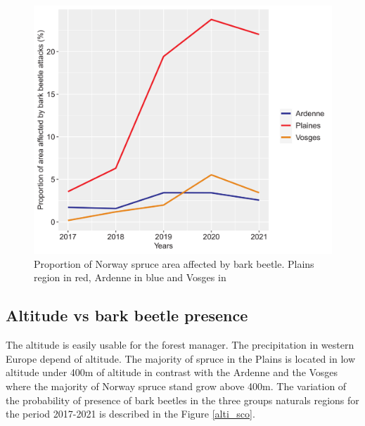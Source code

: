\documentclass[3p,procedia]{elsarticle}
\begin{document}


\begin{figure}
   \centering
   \includegraphics[width=0.6 \textwidth]{Annual_evol_Ardennes_vosges_plaines.png}
    \caption{Proportion of Norway spruce area affected by bark beetle. Plains region in red, Ardenne in blue and Vosges in }
    \label{evol_gen}
\end{figure}

    


\subsection{ Altitude vs bark beetle presence}
The altitude is easily usable for the forest manager.
The precipitation in western Europe depend of altitude. 
The majority of spruce in the Plains is located in low altitude under 400m of altitude in contrast with the Ardenne and the Vosges where the majority of Norway spruce stand grow above 400m. 
The variation of the probability of presence of bark beetles in the three groups naturals regions for the period 2017-2021 is described in the Figure \ref{alti_sco}.
\end{document}
